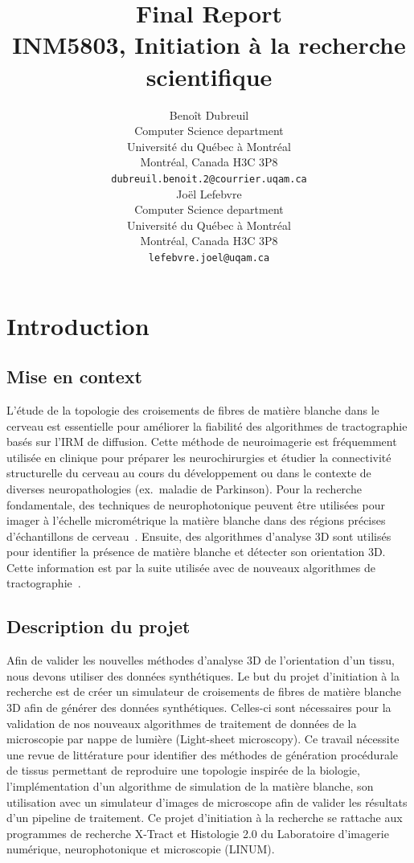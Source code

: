 \documentclass{article}
\title{
  Final Report \\
  INM5803, Initiation à la recherche scientifique}
\author{
  Benoît Dubreuil \\
  Computer Science department \\
  Université du Québec à Montréal \\
  Montréal, Canada H3C 3P8 \\
  \texttt{dubreuil.benoit.2@courrier.uqam.ca} \\
  \And
  Joël Lefebvre \\
  Computer Science department\\
  Université du Québec à Montréal \\
  Montréal, Canada H3C 3P8\\
  \texttt{lefebvre.joel@uqam.ca} \\
}
\begin{document}
  \maketitle


  \section{Introduction}
  \label{sec:introduction}

  \subsection{Mise en context}
  \label{subsec:mise-en-context}
  L'étude de la topologie des croisements de fibres de matière blanche dans le cerveau est essentielle pour améliorer la fiabilité des algorithmes de tractographie
  basés sur l'IRM de diffusion.
  Cette méthode de neuroimagerie est fréquemment utilisée en clinique pour préparer les neurochirurgies et étudier la connectivité structurelle du cerveau au cours du
  développement ou dans le contexte de diverses neuropathologies (ex.\ maladie de Parkinson).
  Pour la recherche fondamentale, des techniques de neurophotonique peuvent être utilisées pour imager à l’échelle micrométrique la matière blanche dans des régions
  précises d'échantillons de cerveau~\cite{lefebvre2021oct}.
  Ensuite, des algorithmes d'analyse 3D sont utilisés pour identifier la présence de matière blanche et détecter son orientation 3D\@.
  Cette information est par la suite utilisée avec de nouveaux algorithmes de tractographie~\cite{oliveirasicard2021orientation3d}.

  \subsection{Description du projet}
  \label{subsec:description-du-projet}
  Afin de valider les nouvelles méthodes d'analyse 3D de l'orientation d’un tissu, nous devons utiliser des données synthétiques.
  Le but du projet d'initiation à la recherche est de créer un simulateur de croisements de fibres de matière blanche 3D afin de générer des données synthétiques.
  Celles-ci sont nécessaires pour la validation de nos nouveaux algorithmes de traitement de données de la microscopie par nappe de lumière (Light-sheet microscopy).
  Ce travail nécessite une revue de littérature pour identifier des méthodes de génération procédurale de tissus permettant de reproduire une topologie inspirée de
  la biologie, l'implémentation d'un algorithme de simulation de la matière blanche, son utilisation avec un simulateur d'images de microscope afin de valider les
  résultats d'un pipeline de traitement.
  Ce projet d'initiation à la recherche se rattache aux programmes de recherche X-Tract et Histologie 2.0 du Laboratoire d’imagerie numérique, neurophotonique et
  microscopie (LINUM).
\end{document}

